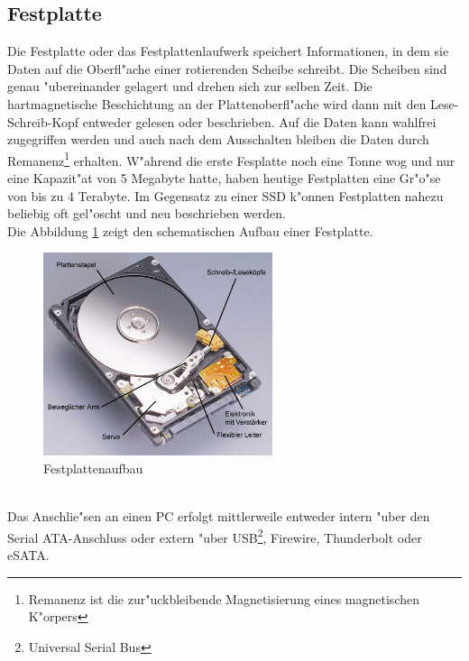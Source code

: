         \subsection{Festplatte}
        \label{ch:Technisch:sec:Magnetische Speicherung:sub:Festplatte}
        
            Die Festplatte oder das Festplattenlaufwerk speichert Informationen, in dem sie Daten auf die Oberfl"ache einer rotierenden Scheibe schreibt. Die Scheiben sind genau "ubereinander gelagert und drehen sich zur selben Zeit. Die hartmagnetische Beschichtung an der Plattenoberfl"ache wird dann mit den Lese-Schreib-Kopf entweder gelesen oder beschrieben. Auf die Daten kann wahlfrei zugegriffen werden und auch nach dem Ausschalten bleiben die Daten durch Remanenz\footnote{Remanenz ist die zur"uckbleibende Magnetisierung eines magnetischen K"orpers} erhalten. W"ahrend die erste Fesplatte noch eine Tonne wog und nur eine Kapazit"at von 5 Megabyte hatte, haben heutige Festplatten eine Gr"o"se von bis zu 4 Terabyte. Im Gegensatz zu einer SSD k"onnen Festplatten nahezu beliebig oft gel"oscht und neu beschrieben werden.
			\\
			Die Abbildung \ref{fig:hdd} zeigt den schematischen Aufbau einer Festplatte.
			\begin{figure}[ht]
				\centering
				\includegraphics[width=0.6\textwidth]{images/hdd} 
				\caption[Festplattenaufbau \cite{fig:hdd}]{Festplattenaufbau}
				\label{fig:hdd}
				\end{figure}
            \\
            Das Anschlie"sen an einen PC erfolgt mittlerweile entweder intern "uber den Serial ATA-Anschluss oder extern "uber USB\footnote{Universal Serial Bus}, Firewire, Thunderbolt oder eSATA. 
    
